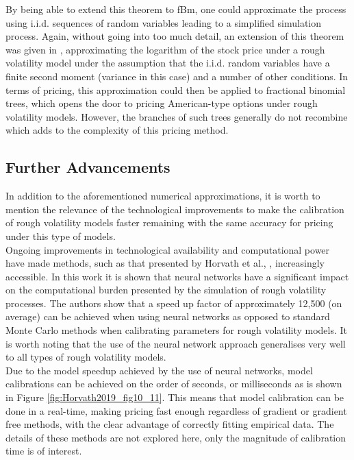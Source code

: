 \documentclass[12pt,oneside]{article}
\begin{document}
By being able to extend this theorem to fBm, one could approximate the process using i.i.d. sequences of random variables leading to a simplified simulation process. Again, without going into too much detail, an extension of this theorem was given in \cite{Horvath2017}, approximating the logarithm of the stock price under a rough volatility model under the assumption that the i.i.d. random variables have a finite second moment (variance in this case) and a number of other conditions. In terms of pricing, this approximation could then be applied to fractional binomial trees, which opens the door to pricing American-type options under rough volatility models. However, the branches of such trees generally do not recombine which adds to the complexity of this pricing method.   

\subsection{Further Advancements}
\label{subsec:tech_advancement}

In addition to the aforementioned numerical approximations, it is worth to mention the relevance of the technological improvements to make the calibration of rough volatility models faster remaining with the same accuracy for pricing under this type of models.
\\

 Ongoing improvements in technological availability and computational power have made methods, such as that presented by Horvath et al., \cite{Horvath2019}, increasingly accessible. In this work it is shown that neural networks have a significant impact on the computational burden presented by the simulation of rough volatility processes. The authors show that a speed up factor of approximately 12,500 (on average) can be achieved when using neural networks as opposed to standard Monte Carlo methods when calibrating parameters for rough volatility models. It is worth noting that the use of the neural network approach generalises very well to all types of rough volatility models. 
 \\
 
 Due to the model speedup achieved by the use of neural networks, model calibrations can be achieved on the order of seconds, or milliseconds as is shown in Figure \ref{fig:Horvath2019_fig10_11}. This means that model calibration can be done in a real-time, making pricing fast enough regardless of gradient or gradient free methods, with the clear advantage of correctly fitting empirical data. The details of these methods are not explored here, only the magnitude of calibration time is of interest. 
 
\end{document}
